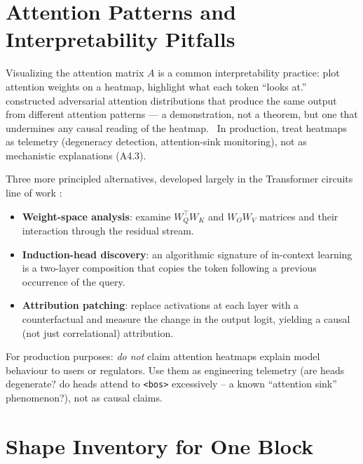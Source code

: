 \section{Attention Patterns and Interpretability Pitfalls}

Visualizing the attention matrix $A$ is a common interpretability
practice: plot attention weights on a heatmap, highlight what each
token ``looks at.'' \Emp\ \citet{jain2019attention} constructed
adversarial attention distributions that produce the same output
from different attention patterns --- a demonstration, not a
theorem, but one that undermines any causal reading of the heatmap.
\Heur\ In production, treat heatmaps as telemetry (degeneracy
detection, attention-sink monitoring), not as mechanistic
explanations (A4.3).

Three more principled alternatives, developed largely in the
Transformer circuits line of work
\citep{elhage2021mathematical, olsson2022induction}:
\begin{itemize}
  \item \textbf{Weight-space analysis}: examine
        $W_Q^{\top} W_K$ and $W_O W_V$ matrices and their interaction
        through the residual stream.
  \item \textbf{Induction-head discovery}: an algorithmic signature
        of in-context learning is a two-layer composition that copies
        the token following a previous occurrence of the query.
  \item \textbf{Attribution patching}: replace activations at each
        layer with a counterfactual and measure the change in the
        output logit, yielding a causal (not just correlational)
        attribution.
\end{itemize}
For production purposes: \emph{do not} claim attention heatmaps
explain model behaviour to users or regulators. Use them as
engineering telemetry (are heads degenerate? do heads attend to
\texttt{<bos>} excessively -- a known ``attention sink'' phenomenon?),
not as causal claims.

\section{Shape Inventory for One Block}

